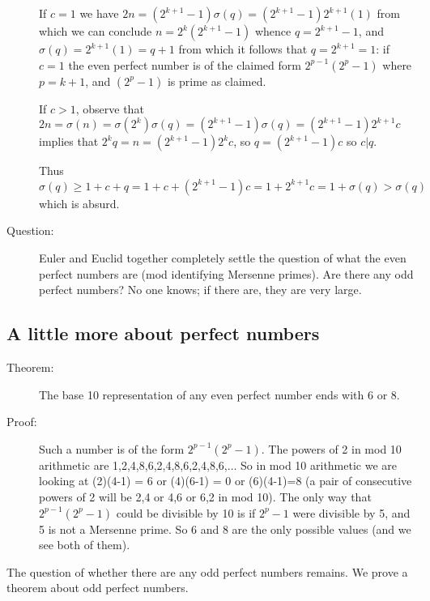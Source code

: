 \documentclass[12pt]{article}
\begin{document}
\begin{description}
If $c=1$ we have $2n=(2^{k+1}-1)\sigma(q) =  (2^{k+1}-1)2^{k+1}(1)$ from which we can conclude $n=2^k(2^{k+1}-1)$ whence $q=2^{k+1}-1$, and $\sigma(q)=2^{k+1}(1)=q+1$ from which it follows that $q=2^{k+1}=1$:
if $c=1$ the even perfect number is of the claimed form $2^{p-1}(2^p-1)$ where $p=k+1$, and $(2^p-1)$ is prime as claimed.

If $c>1$, observe that $2n = \sigma(n)= \sigma(2^k)\sigma(q)= (2^{k+1}-1)\sigma(q) =  (2^{k+1}-1)2^{k+1}c$ implies that $2^kq=n=(2^{k+1}-1)2^{k}c$, so $q=(2^{k+1}-1)c$  so $c | q$.

Thus $\sigma(q) \geq 1+c+q = 1+c+(2^{k+1}-1)c = 1+2^{k+1}c =  1+\sigma(q) >\sigma(q)$ which is absurd.

\item[Question:]   Euler and Euclid together completely settle the question of what the even perfect numbers are (mod identifying Mersenne primes).  Are there any odd perfect numbers?  No one knows; if there are, they are very large.

\end{description}

\subsection{A little more about perfect numbers}

\begin{description}

\item[Theorem:]  The base 10 representation of any even perfect number ends with 6 or 8.

\item[Proof:]  Such a number is of the form $2^{p-1}(2^p-1)$.  The powers of 2 in mod 10 arithmetic are 1,2,4,8,6,2,4,8,6,2,4,8,6,$\ldots$  So in mod 10 arithmetic we are looking
at (2)(4-1) = 6 or (4)(6-1) = 0 or (6)(4-1)=8 (a pair of consecutive powers of 2 will be  2,4 or 4,6 or 6,2 in mod 10).   The only way that $2^{p-1}(2^p-1)$ could be divisible by 10
is if $2^p-1$ were divisible by 5, and 5 is not a Mersenne prime.  So 6 and 8 are the only possible values (and we see both of them).

\end{description}

The question of whether there are any odd perfect numbers remains.  We prove a theorem about odd perfect numbers.
\end{document}
